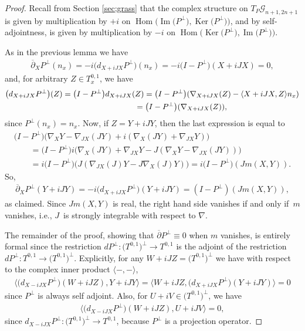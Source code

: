 \documentclass[pdftex]{sigma}
\numberwithin{equation}{section}
\newcommand{\cG}{{\mathcal G}}
\begin{document}
\begin{proof}Recall from Section \ref{sec;grass} that the complex structure on $T_P \cG_{n+1,2n+1}$ is given by multiplication by $+i$ on $\operatorname{Hom}\big(\operatorname{Im}\big(P^\perp\big), \operatorname{Ker}\big(P^\perp\big)\big)$, and by self-adjointness, is given by multiplication by $-i$ on $\operatorname{Hom}\big(\operatorname{Ker}\big(P^\perp\big),\operatorname{Im}\big(P^\perp\big)\big)$.

As in the previous lemma we have
\begin{gather*}
 \overline{\partial}_X P^\perp (n_x) = -i \big( d_{X+iJX} P^\perp \big) (n_x) = -i \big(I-P^\perp\big)(X+iJX) = 0,
\end{gather*}
and, for arbitrary $Z \in T^{0,1}_x$, we have
\begin{gather*}
\big( d_{X+iJX} P^\perp \big) (Z) = \big(I-P^\perp\big) d_{X+iJX} (Z)= \big(I-P^\perp\big) ( \nabla_{X+iJX} (Z) - \langle X+iJX, Z \rangle n_x ) \\
\hphantom{\big( d_{X+iJX} P^\perp \big) (Z)}{} = \big(I-P^\perp\big) ( \nabla_{X+iJX} (Z) ),
 \end{gather*}
 since $P^\perp(n_x) = n_x$. Now, if $Z= Y+iJY$, then the last expression is equal to
 \begin{gather*}
 \big(I -P^\perp\big) \big( \nabla_X Y - \nabla_{JX} (JY) + i ( \nabla_X(JY) + \nabla_{JX} Y ) \big) \\
 \qquad{} = \big(I -P^\perp\big) i \big( \nabla_X(JY) + \nabla_{JX} Y - J(\nabla_X Y - \nabla_{JX} (JY)) \big) \\
 \qquad {}= i \big(I -P^\perp\big) \big( J ( \nabla_{JX} (J) Y - J\nabla_X(J) Y ) \big) = i \big(I - P^\perp\big) ( J m(X,Y) ).
\end{gather*}
 So,
\begin{gather*}
\overline{\partial}_X P^\perp (Y+iJY) = -i \big( d_{X+iJX} P^\perp \big) (Y + iJY) = ( I - P^\perp) ( J m(X,Y) ),
\end{gather*}
as claimed. Since $ J m(X,Y)$ is real, the right hand side vanishes if and only if~$m$ vanishes, i.e., $J $~is strongly integrable with respect to $\nabla$.

The remainder of the proof, showing that $\overline{\partial} P^\perp \equiv 0$ when $m$ vanishes, is entirely formal since the restriction $dP^\perp\colon \big(T^{0,1}\big)^\perp \to T^{0,1}$ is the adjoint of the restriction $dP^\perp\colon T^{0,1} \to \big(T^{0,1}\big)^\perp$. Explicitly, for any $W + i JZ = \big(T^{0,1}\big)^\perp$ we have with respect to the complex inner product $\langle - , - \rangle$,
\begin{gather*}
\big\langle \big( d_{X-iJX} P^\perp \big) (W+iJZ) , Y+i JY \big\rangle
= \big\langle W+iJZ , \big( d_{X+iJX} P^\perp \big)( Y+i JY )\big\rangle = 0
\end{gather*}
since $P^\perp$ is always self adjoint. Also, for $U + iV \in \big(T^{0,1}\big)^\perp$, we have
\begin{gather*}
\big\langle \big( d_{X-iJX} P^\perp \big) (W+iJZ) , U+iJV \big\rangle = 0,
\end{gather*}
since $d_{X-iJX} P^\perp \colon \big(T^{0,1}\big)^\perp \to T^{0,1}$, because $P^\perp$ is a projection operator.
\end{proof}
\end{document}

